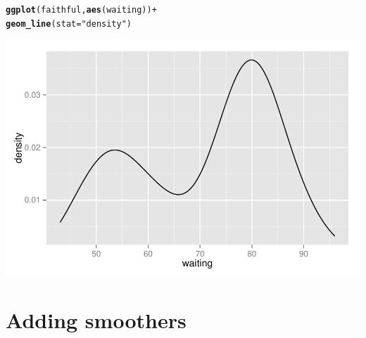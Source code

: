 \documentclass{beamer}\usepackage[]{graphicx}\usepackage[]{color}
\makeatletter
\newcommand{\hlstr}[1]{\textcolor[rgb]{0.192,0.494,0.8}{#1}}%
\newcommand{\hlopt}[1]{\textcolor[rgb]{0,0,0}{#1}}%
\newcommand{\hlstd}[1]{\textcolor[rgb]{0.345,0.345,0.345}{#1}}%
\newcommand{\hlkwc}[1]{\textcolor[rgb]{0.333,0.667,0.333}{#1}}%
\newcommand{\hlkwd}[1]{\textcolor[rgb]{0.737,0.353,0.396}{\textbf{#1}}}%
\newenvironment{kframe}{%
 \def\at@end@of@kframe{}%
 \ifinner\ifhmode%
  \def\at@end@of@kframe{\end{minipage}}%
  \begin{minipage}{\columnwidth}%
 \fi\fi%
 \def\FrameCommand##1{\hskip\@totalleftmargin \hskip-\fboxsep
 \colorbox{shadecolor}{##1}\hskip-\fboxsep
     \hskip-\linewidth \hskip-\@totalleftmargin \hskip\columnwidth}%
 \MakeFramed {\advance\hsize-\width
   \@totalleftmargin\z@ \linewidth\hsize
   \@setminipage}}%
 {\par\unskip\endMakeFramed%
 \at@end@of@kframe}
\newenvironment{knitrout}{}{} %
\makeatother
\begin{document}

\begin{frame}[fragile]
\begin{knitrout}\footnotesize
{}\color{fgcolor}\begin{kframe}
\begin{alltt}
\hlkwd{ggplot}\hlstd{(faithful,} \hlkwd{aes}\hlstd{(waiting))} \hlopt{+}
\hlkwd{geom_line}\hlstd{(}\hlkwc{stat} \hlstd{=} \hlstr{"density"}\hlstd{)}
\end{alltt}
\end{kframe}

{\centering \includegraphics[width=.75\linewidth]{figure/densitytwo___} 

}



\end{knitrout}
\end{frame}


\section*{Adding smoothers}
\frame{\sectionpage}

\end{document}
